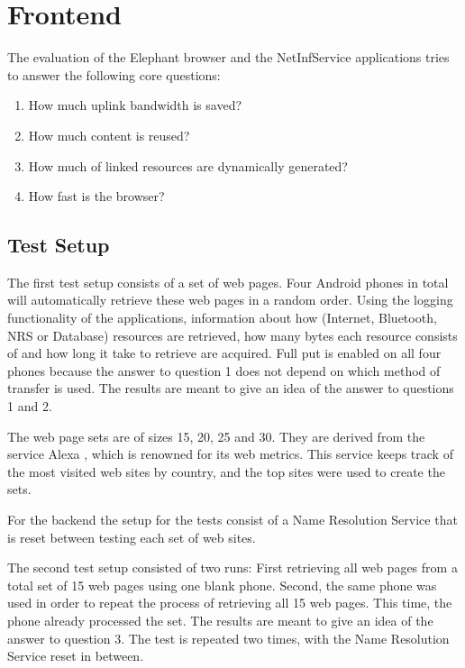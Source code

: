 \section{Frontend}

The evaluation of the Elephant browser and the NetInfService applications tries to answer the following core questions:

\begin{enumerate}
\item How much uplink bandwidth is saved?
\item How much content is reused?
\item How much of linked resources are dynamically generated?
\item How fast is the browser?
\end{enumerate}

\subsection{Test Setup}

The first test setup consists of a set of web pages. 
Four Android phones in total will automatically retrieve these
web pages in a random order. Using the logging functionality of the 
applications, information about how (Internet, Bluetooth, NRS or Database) 
resources are retrieved, how many bytes each resource consists of 
and how long it take to retrieve are acquired. Full put is 
enabled on all four phones because the answer to question 1 
does not depend on which method of transfer is used. 
The results are meant to give an idea of the answer to 
questions 1 and 2.

The web page sets are of sizes 15, 20, 25 and 30. 
They are derived from the service Alexa \cite{alexa},
which is renowned for its web metrics. 
This service keeps track of the most visited web sites by country, 
and the top sites were used to create the sets.

For the backend the setup for the tests consist of a 
Name Resolution Service that is reset between 
testing each set of web sites.

The second test setup consisted of two runs: First 
retrieving all web pages from a total set of 15 web pages using one blank
phone. Second, the same phone was used in order to repeat the process
of retrieving all 15 web pages. This time, the phone already
processed the set.
The results are meant to give an idea of the answer to question 3. 
The test is repeated two times, with the Name Resolution Service 
reset in between. 

